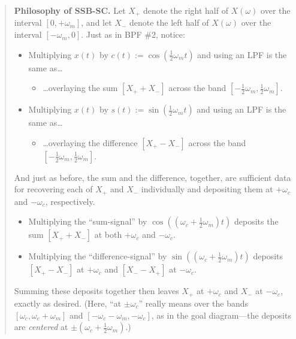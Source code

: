 \begin{quote}
    \textbf{Philosophy of SSB-SC.}
    Let $X_+$ denote the right half of $X(\omega)$
    over the interval $[0, +\omega_m]$, and
    let $X_-$ denote the left half of $X(\omega)$
    over the interval $[-\omega_m, 0]$.
    Just as in BPF \#2, notice:
    \begin{itemize}
        \item Multiplying $x(t)$ by $c(t) := \cos\left(\frac{1}{2}\omega_m t\right)$
        and using an LPF is the same as\dots
        \begin{itemize}
            \item \dots overlaying the sum $[X_+ + X_-]$
            across the band $\left[-\frac{1}{2}\omega_m, \frac{1}{2}\omega_m\right]$.
        \end{itemize}
        \item Multiplying $x(t)$ by $s(t) := \sin\left(\frac{1}{2}\omega_m t\right)$
        and using an LPF is the same as\dots
        \begin{itemize}
            \item \dots overlaying the difference $[X_+ - X_-]$
            across the band $\left[-\frac{1}{2}\omega_m, \frac{1}{2}\omega_m\right]$.
        \end{itemize}
    \end{itemize}
    And just as before,
    the sum and the difference, together,
    are sufficient data for recovering each of $X_+$ and $X_-$ individually
    and depositing them at $+\omega_c$ and $-\omega_c$, respectively.
    \begin{itemize}
        \item Multiplying the ``sum-signal'' by $\cos\left((\omega_c + \frac{1}{2}\omega_m)t\right)$
        deposits the sum $[X_+ + X_-]$ at both $+\omega_c$ and $-\omega_c$.
        \item Multiplying the ``difference-signal'' by $\sin\left((\omega_c + \frac{1}{2}\omega_m)t\right)$
        deposits $[X_+ - X_-]$ at $+\omega_c$ and $[X_- - X_+]$ at $-\omega_c$.
    \end{itemize}
    Summing these deposits together then leaves
    $X_+$ at $+\omega_c$ and $X_-$ at $-\omega_c$,
    exactly as desired.
    (Here, ``at $\pm\omega_c$'' really means over the bands
    $[\omega_c, \omega_c + \omega_m]$ and $[-\omega_c - \omega_m, -\omega_c]$,
    as in the goal diagram---the deposits are \emph{centered}
    at $\pm(\omega_c + \frac{1}{2}\omega_m)$.)
\end{quote}


